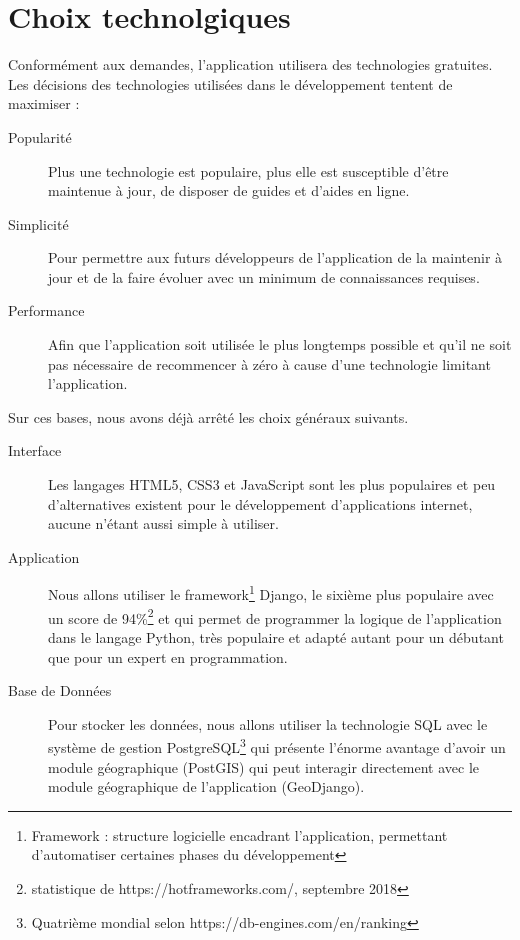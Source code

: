 \documentclass[a4paper, 11pt]{article}
\begin{document}
\section{Choix technolgiques}
  Conformément aux demandes, l'application utilisera des technologies gratuites. Les décisions des technologies utilisées dans le développement tentent de maximiser :
  \begin{description}
    \item[Popularité] Plus une technologie est populaire, plus elle est susceptible d'être maintenue à jour, de disposer de guides et d'aides en ligne.
    \item[Simplicité] Pour permettre aux futurs développeurs de l'application de la maintenir à jour et de la faire évoluer avec un minimum de connaissances requises.
    \item[Performance] Afin que l'application soit utilisée le plus longtemps possible et qu'il ne soit pas nécessaire de recommencer à zéro à cause d'une technologie limitant l'application.
  \end{description}

  Sur ces bases, nous avons déjà arrêté les choix généraux suivants.
  \begin{description}
    \item[Interface] Les langages HTML5, CSS3 et JavaScript sont les plus populaires et peu d'alternatives existent pour le développement d'applications internet, aucune n'étant aussi simple à utiliser.
    \item[Application] Nous allons utiliser le framework\footnote{Framework : structure logicielle encadrant l'application, permettant d'automatiser certaines phases du développement} Django, le sixième plus populaire avec un score de 94\%\footnote{statistique de https://hotframeworks.com/, septembre 2018} et qui permet de programmer la logique de l'application dans le langage Python, très populaire et adapté autant pour un débutant que pour un expert en programmation.
    \item[Base de Données] Pour stocker les données, nous allons utiliser la technologie SQL avec le système de gestion PostgreSQL\footnote{Quatrième mondial selon https://db-engines.com/en/ranking} qui présente l'énorme avantage d'avoir un module géographique (PostGIS) qui peut interagir directement avec le module géographique de l'application (GeoDjango).
  \end{description}
\end{document}
